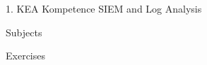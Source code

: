 \documentclass[Screen16to9,17pt]{foils}
\begin{document}
\mytitlepage
{1. }
{KEA Kompetence SIEM and Log Analysis}




\begin{list1}
\item Subjects
\begin{list2}
\item
\end{list2}
\item Exercises
\begin{list2}
\item
\end{list2}
\end{list1}


\begin{list1}
\item
\item
\end{list1}



\begin{quote}

\end{quote}

\begin{list1}
\item 
\begin{list2}
\item
\end{list2}
\end{list1}





\begin{list1}
\item
\end{list1}

\slidenext{}
\end{document}
